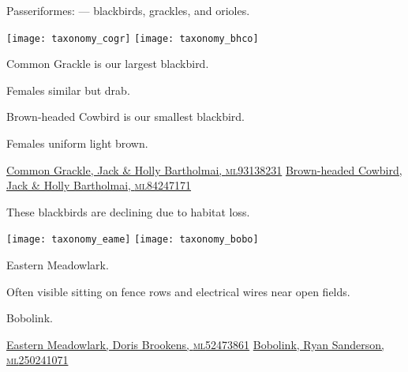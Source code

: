 \documentclass[t]{beamer}
\newcommand{\backoneline}{\vspace{-\baselineskip}}
\begin{document}
%

\begin{frame}{Passeriformes:  — blackbirds, grackles, and orioles.}
	
	\texttt{[image: taxonomy\_cogr]}\hfill
	\texttt{[image: taxonomy\_bhco]}
	
	\backoneline
	
	\begin{multicols}{2}
		Common Grackle is our largest blackbird.
		
		\medskip
		
		Females similar but drab.
		
		\columnbreak
		
		Brown-headed Cowbird is our smallest blackbird.
		
		\medskip
		
		Females uniform light brown.
		
	\end{multicols}	
	
	\vfilll
	
	\tiny
	
	\href{https://macaulaylibrary.org/asset/93138231}{Common Grackle, Jack \& Holly Bartholmai, \textsc{ml}93138231} \hfill 
	\href{https://macaulaylibrary.org/asset/84247171}{Brown-headed Cowbird, Jack \& Holly Bartholmai, \textsc{ml}84247171}
	
\end{frame}

%

\begin{frame}{These blackbirds are declining due to habitat loss.}
	
	\texttt{[image: taxonomy\_eame]}\hfill
	\texttt{[image: taxonomy\_bobo]}
	
	\backoneline
	
	\begin{multicols}{2}
		Eastern Meadowlark.
		
		\medskip
		
		Often visible sitting on fence rows and electrical wires near open fields.
				
		\columnbreak
		
		Bobolink.
				
	\end{multicols}	
	
	\vfilll
	
	\tiny
	
	\href{https://macaulaylibrary.org/asset/52473861}{Eastern Meadowlark, Doris Brookens, \textsc{ml}52473861} \hfill 
	\href{https://macaulaylibrary.org/asset/250241071}{Bobolink, Ryan Sanderson, \textsc{ml}250241071}
	
\end{frame}
\end{document}
